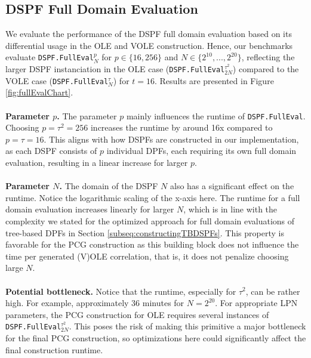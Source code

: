\subsection{DSPF Full Domain Evaluation}
\label{subsec:evalDspfFullDomain}
We evaluate the performance of the DSPF full domain evaluation based on its differential usage in the OLE and VOLE construction. Hence, our benchmarks evaluate \texttt{DSPF.FullEval}$_N^p$ for $p\in\{16,256\}$ and $N\in\{2^{10}, ..., 2^{20}\}$, reflecting the larger DSPF instanciation in the OLE case (\texttt{DSPF.FullEval}$_{2N}^{\tau^2}$) compared to the VOLE case (\texttt{DSPF.FullEval}$_{N}^{\tau}$) for $t=16$. Results are presented in Figure \ref{fig:fullEvalChart}.
\\\\
\textbf{Parameter $p$.} The parameter $p$ mainly influences the runtime of \texttt{DSPF.FullEval}. Choosing $p=\tau^2=256$ increases the runtime by around 16x compared to $p=\tau=16$. This aligns with how DSPFs are constructed in our implementation, as each DSPF consists of $p$ individual DPFs, each requiring its own full domain evaluation, resulting in a linear increase for larger $p$.
\\\\
\textbf{Parameter $N$.} The domain of the DSPF $N$ also has a significant effect on the runtime. Notice the logarithmic scaling of the x-axis here. The runtime for a full domain evaluation increases linearly for larger $N$, which is in line with the complexity we stated for the optimized approach for full domain evaluations of tree-based DPFs in Section \ref{subseq:constructingTBDSPFs}. This property is favorable for the PCG construction as this building block does not influence the time per generated (V)OLE correlation, that is, it does not penalize choosing large $N$.
\\\\
\textbf{Potential bottleneck.} Notice that the runtime, especially for $\tau^2$, can be rather high. For example, approximately 36 minutes for $N=2^{20}$. For appropriate LPN parameters, the PCG construction for OLE requires several instances of \texttt{DSPF.FullEval}$_{2N}^{\tau^2}$. This poses the risk of making this primitive a major bottleneck for the final PCG construction, so optimizations here could significantly affect the final construction runtime.
\\\\
